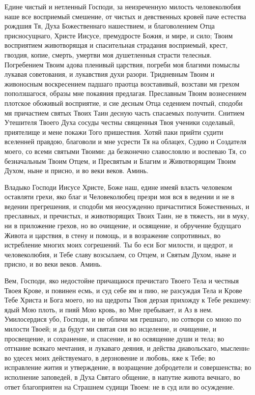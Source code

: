 \begin{mymulticols}
Едине чистый и нетленный Господи, за неизреченную милость человеколюбия наше все восприемый смешение, от чистых и девственных кровей паче естества рождшия Тя, Духа Божественнаго нашествием, и благоволением Отца присносущнаго, Христе Иисусе, премудросте Божия, и мире, и сило; Твоим восприятием животворящая и спасительная страдания восприемый, крест, гвоздия, копие, смерть, умертви моя душетленныя страсти телесныя. Погребением Твоим адова пленивый царствия, погреби моя благими помыслы лукавая советования, и лукавствия духи разори. Тридневным Твоим и живоносным воскресением падшаго праотца возставивый, возстави мя грехом поползшагося, образы мне покаяния предлагая. Преславным Твоим вознесением плотское обоживый восприятие, и сие десным Отца седением почтый, сподоби мя причастием святых Твоих Таин десную часть спасаемых получити. Снитием Утешителя Твоего Духа сосуды честны священныя Твоя ученики соделавый, приятелище и мене покажи Того пришествия. Хотяй паки прийти судити вселенней правдою, благоволи и мне усрести Тя на облацех, Судию и Создателя моего, со всеми святыми Твоими: да безконечно славословлю и воспеваю Тя, со безначальным Твоим Отцем, и Пресвятым и Благим и Животворящим Твоим Духом, ныне и присно, и во веки веков. Аминь.


Владыко Господи Иисусе Христе, Боже наш, едине имеяй власть человеком оставляти грехи, яко благ и Человеколюбец презри моя вся в ведении и не в ведении прегрешения, и сподоби мя неосужденно причаститися Божественных, и преславных, и пречистых, и животворящих Твоих Таин, не в тяжесть, ни в муку, ни в приложение грехов, но во очищение, и освящение, и обручение будущаго Живота и царствия, в стену и помощь, и в возражение сопротивных, во истребление многих моих согрешений. Ты бо еси Бог милости, и щедрот, и человеколюбия, и Тебе славу возсылаем, со Отцем, и Святым Духом, ныне и присно, и во веки веков. Аминь.


Вем, Господи, яко недостойне причащаюся пречистаго Твоего Тела и честныя Твоея Крове, и повинен есмь, и суд себе ям и пию, не разсуждая Тела и Крове Тебе Христа и Бога моего, но на щедроты Твоя дерзая прихожду к Тебе рекшему: ядый Мою плоть, и пияй Мою кровь, во Мне пребывает, и Аз в нем. Умилосердися убо, Господи, и не обличи мя грешнаго, но сотвори со мною по милости Твоей; и да будут ми святая сия во исцеление, и очищение, и просвещение, и сохранение, и спасение, и во освящение души и тела; во отгнание всякаго мечтания, и лукаваго деяния, и действа диавольскаго, мысленнe во удесех моих действуемаго, в дерзновение и любовь, яже к Тебе; во исправление жития и утверждение, в возращение добродетели и совершенства; во исполнение заповедей, в Духа Святаго общение, в напутие живота вечнаго, во ответ благоприятен на Страшнем судищи Твоем: не в суд или во осуждение.


\end{mymulticols}
